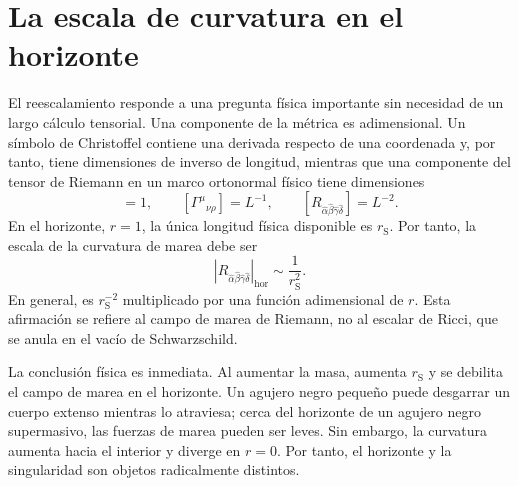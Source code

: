 \begin{classroomqa}
\end{classroomqa}

\section{La escala de curvatura en el horizonte}

El reescalamiento responde a una pregunta física importante sin necesidad de un largo cálculo tensorial. Una componente de la métrica es adimensional. Un símbolo de Christoffel contiene una derivada respecto de una coordenada y, por tanto, tiene dimensiones de inverso de longitud, mientras que una componente del tensor de Riemann en un marco ortonormal físico tiene dimensiones
\begin{equation}
[g_{\mu\nu}]=1,
\qquad
[\Gamma^\mu{}_{\nu\rho}]=L^{-1},
\qquad
[R_{\hat\alpha\hat\beta\hat\gamma\hat\delta}]
=L^{-2}.
\label{eq:l7-curvature-dimensions}
\end{equation}
En el horizonte, \(r=1\), la única longitud física disponible es \(r_{\mathrm S}\). Por tanto, la escala de la curvatura de marea debe ser
\begin{equation}
\left|R_{\hat\alpha\hat\beta\hat\gamma\hat\delta}\right|_{\mathrm{hor}}
\sim \frac{1}{r_{\mathrm S}^2}.
\label{eq:l7-horizon-curvature}
\end{equation}
En general, es \(r_{\mathrm S}^{-2}\) multiplicado por una función adimensional de \(r\). Esta afirmación se refiere al campo de marea de Riemann, no al escalar de Ricci, que se anula en el vacío de Schwarzschild.

La conclusión física es inmediata. Al aumentar la masa, aumenta \(r_{\mathrm S}\) y se debilita el campo de marea en el horizonte. Un agujero negro pequeño puede desgarrar un cuerpo extenso mientras lo atraviesa; cerca del horizonte de un agujero negro supermasivo, las fuerzas de marea pueden ser leves. Sin embargo, la curvatura aumenta hacia el interior y diverge en \(r=0\). Por tanto, el horizonte y la singularidad son objetos radicalmente distintos.

